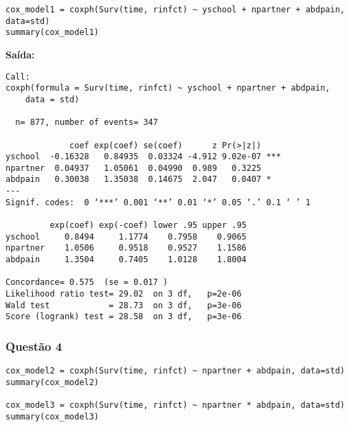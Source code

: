 \documentclass[a4paper,12pt]{article}
\begin{document}
\begin{lstlisting}
cox_model1 = coxph(Surv(time, rinfct) ~ yschool + npartner + abdpain, data=std)
summary(cox_model1)
\end{lstlisting}

\textbf{Saída:}
\begin{verbatim}
Call:
coxph(formula = Surv(time, rinfct) ~ yschool + npartner + abdpain, 
    data = std)

  n= 877, number of events= 347 

             coef exp(coef) se(coef)      z Pr(>|z|)    
yschool  -0.16328   0.84935  0.03324 -4.912 9.02e-07 ***
npartner  0.04937   1.05061  0.04990  0.989   0.3225    
abdpain   0.30038   1.35038  0.14675  2.047   0.0407 *  
---
Signif. codes:  0 ‘***’ 0.001 ‘**’ 0.01 ‘*’ 0.05 ‘.’ 0.1 ‘ ’ 1

         exp(coef) exp(-coef) lower .95 upper .95
yschool     0.8494     1.1774    0.7958    0.9065
npartner    1.0506     0.9518    0.9527    1.1586
abdpain     1.3504     0.7405    1.0128    1.8004

Concordance= 0.575  (se = 0.017 )
Likelihood ratio test= 29.02  on 3 df,   p=2e-06
Wald test            = 28.73  on 3 df,   p=3e-06
Score (logrank) test = 28.58  on 3 df,   p=3e-06
\end{verbatim}


\subsubsection{Questão 4}

\begin{lstlisting}
cox_model2 = coxph(Surv(time, rinfct) ~ npartner + abdpain, data=std)
summary(cox_model2)

cox_model3 = coxph(Surv(time, rinfct) ~ npartner * abdpain, data=std)
summary(cox_model3)
\end{lstlisting}
\end{document}

